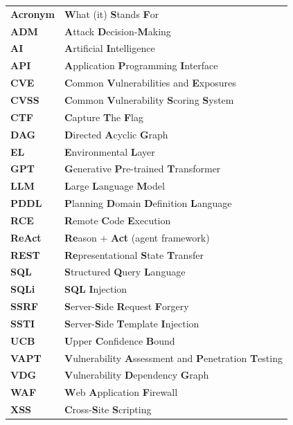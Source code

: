 \begin{tabular}{ll}
	\textbf{Acronym} & \textbf{W}hat (it) \textbf{S}tands \textbf{F}or \\[0.5em]
	\textbf{ADM}    & \textbf{A}ttack \textbf{D}ecision-\textbf{M}aking \\
	\textbf{AI}     & \textbf{A}rtificial \textbf{I}ntelligence \\
	\textbf{API}    & \textbf{A}pplication \textbf{P}rogramming \textbf{I}nterface \\
	\textbf{CVE}    & \textbf{C}ommon \textbf{V}ulnerabilities and \textbf{E}xposures \\
	\textbf{CVSS}   & \textbf{C}ommon \textbf{V}ulnerability \textbf{S}coring \textbf{S}ystem \\
	\textbf{CTF}    & \textbf{C}apture \textbf{T}he \textbf{F}lag \\
	\textbf{DAG}    & \textbf{D}irected \textbf{A}cyclic \textbf{G}raph \\
	\textbf{EL}     & \textbf{E}nvironmental \textbf{L}ayer \\
	\textbf{GPT}    & \textbf{G}enerative \textbf{P}re-trained \textbf{T}ransformer \\
	\textbf{LLM}    & \textbf{L}arge \textbf{L}anguage \textbf{M}odel \\
	\textbf{PDDL}   & \textbf{P}lanning \textbf{D}omain \textbf{D}efinition \textbf{L}anguage \\
	\textbf{RCE}    & \textbf{R}emote \textbf{C}ode \textbf{E}xecution \\
	\textbf{ReAct}  & \textbf{Re}ason + \textbf{Act} (agent framework) \\
	\textbf{REST}   & \textbf{Re}presentational \textbf{S}tate \textbf{T}ransfer \\
	\textbf{SQL}    & \textbf{S}tructured \textbf{Q}uery \textbf{L}anguage \\
	\textbf{SQLi}   & \textbf{SQL} \textbf{I}njection \\
	\textbf{SSRF}   & \textbf{S}erver-\textbf{S}ide \textbf{R}equest \textbf{F}orgery \\
	\textbf{SSTI}   & \textbf{S}erver-\textbf{S}ide \textbf{T}emplate \textbf{I}njection \\
	\textbf{UCB}    & \textbf{U}pper \textbf{C}onfidence \textbf{B}ound \\
	\textbf{VAPT}   & \textbf{V}ulnerability \textbf{A}ssessment and \textbf{P}enetration \textbf{T}esting \\
	\textbf{VDG}    & \textbf{V}ulnerability \textbf{D}ependency \textbf{G}raph \\
	\textbf{WAF}    & \textbf{W}eb \textbf{A}pplication \textbf{F}irewall \\
	\textbf{XSS}    & \textbf{C}ross-\textbf{S}ite \textbf{S}cripting \\
\end{tabular}
\clearpage
